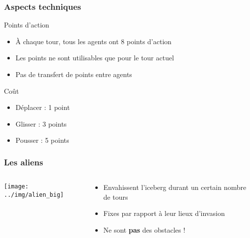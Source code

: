 \documentclass{beamer}
\begin{document}
\begin{frame}
    \frametitle{Aspects techniques}
    \begin{block}{Points d'action}
        \begin{itemize}
            \item À chaque tour, tous les agents ont 8 points d'action
            \item Les points ne sont utilisables que pour le tour actuel
            \item Pas de transfert de points entre agents
        \end{itemize}
    \end{block}
    \begin{block}{Coût}
        \begin{itemize}
            \item Déplacer : 1 point
            \item Glisser : 3 points
            \item Pousser : 5 points
        \end{itemize}
    \end{block}
\end{frame}

\begin{frame}
    \frametitle{Les aliens}
    \begin{columns}[T]
        \begin{column}{.2\textwidth}
            \texttt{[image: ../img/alien\_big]}
        \end{column}
        \begin{column}{.8\textwidth}
            \begin{itemize}
                \item Envahissent l'iceberg durant un certain nombre de tours
                \item Fixes par rapport à leur lieux d'invasion
                \item Ne sont \textbf{pas} des obstacles !
            \end{itemize}
        \end{column}
    \end{columns}
\end{frame}
\end{document}
